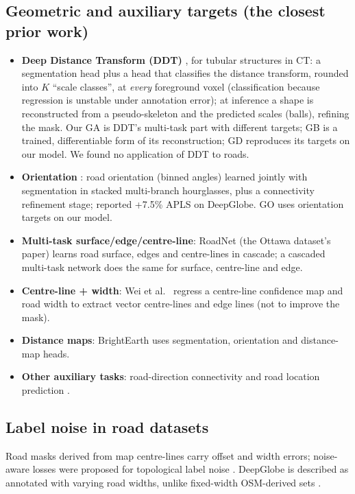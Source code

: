 \documentclass[11pt]{article}
\begin{document}
\subsection{Geometric and auxiliary targets (the closest prior work)}
\begin{itemize}
  \item \textbf{Deep Distance Transform (DDT)} \cite{wang2020ddt}, for tubular structures in CT: a
        segmentation head plus a head that classifies the distance transform, rounded into $K$
        ``scale classes'', at \emph{every} foreground voxel (classification because regression is
        unstable under annotation error); at inference a shape is reconstructed from a pseudo-skeleton
        and the predicted scales (balls), refining the mask. Our GA is DDT's multi-task part with
        different targets; GB is a trained, differentiable form of its reconstruction; GD reproduces
        its targets on our model. We found no application of DDT to roads.
  \item \textbf{Orientation} \cite{batra2019}: road orientation (binned angles) learned jointly with
        segmentation in stacked multi-branch hourglasses, plus a connectivity refinement stage;
        reported +7.5\% APLS on DeepGlobe. GO uses orientation targets on our model.
  \item \textbf{Multi-task surface/edge/centre-line}: RoadNet \cite{liu2019roadnet} (the Ottawa
        dataset's paper) learns road surface, edges and centre-lines in cascade; a cascaded multi-task
        network \cite{cascade2022} does the same for surface, centre-line and edge.
  \item \textbf{Centre-line + width}: Wei et al.\ \cite{wei2020width} regress a centre-line confidence
        map and road width to extract vector centre-lines and edge lines (not to improve the mask).
  \item \textbf{Distance maps}: BrightEarth \cite{brightearth2024} uses segmentation, orientation and
        distance-map heads.
  \item \textbf{Other auxiliary tasks}: road-direction connectivity \cite{connectivity2023} and road
        location prediction \cite{location2021}.
\end{itemize}

\subsection{Label noise in road datasets}
Road masks derived from map centre-lines carry offset and width errors; noise-aware losses were
proposed for topological label noise \cite{henry2020noise}. DeepGlobe is described as annotated with
varying road widths, unlike fixed-width OSM-derived sets \cite{globalroad2024}.
\end{document}
